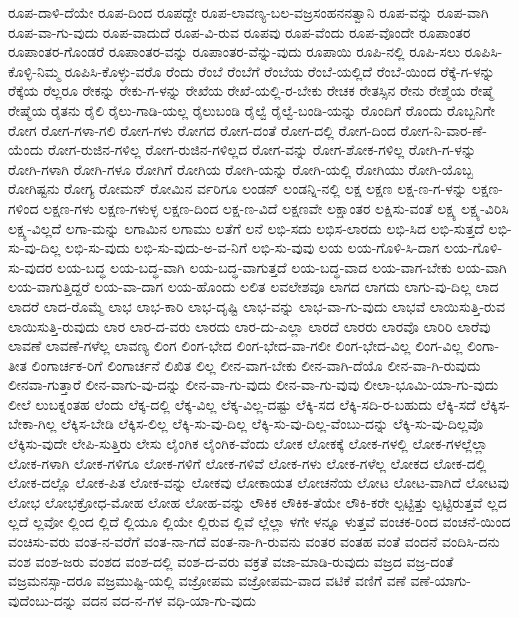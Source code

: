 {ರೂಪ-ದಾಳಿ-ದೆಯೇ
ರೂಪ-ದಿಂದ
ರೂಪದ್ದೇ
ರೂಪ-ಲಾವಣ್ಯ-ಬಲ-ವಜ್ರಸಂಹನನತ್ವಾನಿ
ರೂಪ-ವನ್ನು
ರೂಪ-ವಾಗಿ
ರೂಪ-ವಾ-ಗು-ವುದು
ರೂಪ-ವಾದುದೆ
ರೂಪ-ವಿ-ರುವ
ರೂಪವು
ರೂಪ-ವೆಂದು
ರೂಪ-ವೊಂದೇ
ರೂಪಾಂತರ
ರೂಪಾಂತರ-ಗೊಂಡರೆ
ರೂಪಾಂತರ-ವನ್ನು
ರೂಪಾಂತರ-ವೆನ್ನು-ವುದು
ರೂಪಾಯಿ
ರೂಪಿ-ನಲ್ಲಿ
ರೂಪಿ-ಸಲು
ರೂಪಿಸಿ-ಕೊಳ್ಳಿ-ನಿಮ್ಮ
ರೂಪಿಸಿ-ಕೊಳ್ಳು-ವರೊ
ರೆಂದು
ರೆಂಬೆ
ರೆಂಬೆಗೆ
ರೆಂಬೆಯ
ರೆಂಬೆ-ಯಲ್ಲಿದೆ
ರೆಂಬೆ-ಯಿಂದ
ರೆಕ್ಕೆ-ಗ-ಳನ್ನು
ರೆಕ್ಕೆಯ
ರೆಲ್ಲರೂ
ರೇಕನ್ನು
ರೇಕು-ಗ-ಳನ್ನು
ರೇಖೆಯ
ರೇಖೆ-ಯಲ್ಲಿ-ರ-ಬೇಕು
ರೇಚಕ
ರೇತಸ್ಸಿನ
ರೇನು
ರೇಶ್ಮೆಯ
ರೇಷ್ಮೆ
ರೇಷ್ಮೆಯ
ರೈತನು
ರೈಲಿ
ರೈಲು-ಗಾಡಿ-ಯಲ್ಲ
ರೈಲುಬಂಡಿ
ರೈಲ್ವೆ
ರೈಲ್ವೆ-ಬಂಡಿ-ಯನ್ನು
ರೊಂದಿಗೆ
ರೊಂದು
ರೊಬ್ಬನಿಗೇ
ರೋಗ
ರೋಗ-ಗಳಾ-ಗಲಿ
ರೋಗ-ಗಳು
ರೋಗದ
ರೋಗ-ದಂತೆ
ರೋಗ-ದಲ್ಲಿ
ರೋಗ-ದಿಂದ
ರೋಗ-ನಿ-ವಾರ-ಣೆ-ಯೆಂದು
ರೋಗ-ರುಜಿನ-ಗಳಿಲ್ಲ
ರೋಗ-ರುಜಿನ-ಗಳಿಲ್ಲದ
ರೋಗ-ವನ್ನು
ರೋಗ-ಶೋಕ-ಗಳಿಲ್ಲ
ರೋಗಿ-ಗ-ಳನ್ನು
ರೋಗಿ-ಗಳಾಗಿ
ರೋಗಿ-ಗಳೂ
ರೋಗಿಗೆ
ರೋಗಿಯ
ರೋಗಿ-ಯನ್ನು
ರೋಗಿ-ಯಲ್ಲಿ
ರೋಗಿಯು
ರೋಗಿ-ಯೊಬ್ಬ
ರೋಗಿಷ್ಟನು
ರೋಗ್ಯ
ರೋಮನ್
ರೋಮಿನ
ರ್ವರಿಗೂ
ಲಂಡನ್
ಲಂಡನ್ನಿ-ನಲ್ಲಿ
ಲಕ್ಷ
ಲಕ್ಷಣ
ಲಕ್ಷ-ಣ-ಗ-ಳನ್ನು
ಲಕ್ಷಣ-ಗಳಿಂದ
ಲಕ್ಷಣ-ಗಳು
ಲಕ್ಷಣ-ಗಳುಳ್ಳ
ಲಕ್ಷಣ-ದಿಂದ
ಲಕ್ಷ-ಣ-ವಿದೆ
ಲಕ್ಷಣವೇ
ಲಕ್ಷಾಂತರ
ಲಕ್ಷಿಸು-ವಂತೆ
ಲಕ್ಷ್ಯ
ಲಕ್ಷ್ಯ-ವಿರಿಸಿ
ಲಕ್ಷ್ಯ-ವಿಲ್ಲದೆ
ಲಗಾ-ಮನ್ನು
ಲಗಾಮಿನ
ಲಗಾಮು
ಲತೆಗೆ
ಲನೆ
ಲಭಿ-ಸದು
ಲಭಿಸ-ಲಾರದು
ಲಭಿ-ಸಿದ
ಲಭಿ-ಸುತ್ತದೆ
ಲಭಿ-ಸು-ವು-ದಿಲ್ಲ
ಲಭಿ-ಸು-ವುದು
ಲಭಿ-ಸು-ವುದು-ಅ-ವ-ನಿಗೆ
ಲಭಿ-ಸು-ವುವು
ಲಯ
ಲಯ-ಗೊಳಿ-ಸಿ-ದಾಗ
ಲಯ-ಗೊಳಿ-ಸು-ವುದರ
ಲಯ-ಬದ್ಧ
ಲಯ-ಬದ್ಧ-ವಾಗಿ
ಲಯ-ಬದ್ಧ-ವಾಗುತ್ತದೆ
ಲಯ-ಬದ್ಧ-ವಾದ
ಲಯ-ವಾಗ-ಬೇಕು
ಲಯ-ವಾಗಿ
ಲಯ-ವಾಗುತ್ತಿದ್ದರೆ
ಲಯ-ವಾ-ದಾಗ
ಲಯ-ಹೊಂದು
ಲಲಿತ
ಲವಲೇಶವೂ
ಲಾಗದ
ಲಾಗದು
ಲಾಗು-ವು-ದಿಲ್ಲ
ಲಾದ
ಲಾದರೆ
ಲಾದ-ರೊಮ್ಮೆ
ಲಾಭ
ಲಾಭ-ಕಾರಿ
ಲಾಭ-ದೃಷ್ಟಿ
ಲಾಭ-ವನ್ನು
ಲಾಭ-ವಾ-ಗು-ವುದು
ಲಾಭವೆ
ಲಾಯಿಸುತ್ತಿ-ರುವ
ಲಾಯಿಸುತ್ತಿ-ರುವುದು
ಲಾರ
ಲಾರ-ದ-ವರು
ಲಾರದು
ಲಾರ-ದು-ಎಲ್ಲಾ
ಲಾರದೆ
ಲಾರರು
ಲಾರವೊ
ಲಾರಿರಿ
ಲಾರೆವು
ಲಾವಣೆ
ಲಾವಣೆ-ಗಳೆಲ್ಲ
ಲಾವಣ್ಯ
ಲಿಂಗ
ಲಿಂಗ-ಭೇದ
ಲಿಂಗ-ಭೇದ-ವಾ-ಗಲೀ
ಲಿಂಗ-ಭೇದ-ವಿಲ್ಲ
ಲಿಂಗ-ವಿಲ್ಲ
ಲಿಂಗಾ-ತೀತ
ಲಿಂಗಾರ್ಚಕ-ರಿಗೆ
ಲಿಂಗಾರ್ಚನೆ
ಲಿಖಿತ
ಲಿಲ್ಲ
ಲೀನ-ವಾಗ-ಬೇಕು
ಲೀನ-ವಾಗಿ-ದೆಯೊ
ಲೀನ-ವಾ-ಗಿ-ರುವುದು
ಲೀನವಾ-ಗುತ್ತಾರೆ
ಲೀನ-ವಾಗು-ವು-ದನ್ನು
ಲೀನ-ವಾ-ಗು-ವುದು
ಲೀನ-ವಾ-ಗು-ವುವು
ಲೀಲಾ-ಭೂಮಿ-ಯಾ-ಗು-ವುದು
ಲೀಲೆ
ಲುಬಕ್ನಂತಹ
ಲೆಂದು
ಲೆಕ್ಕ-ದಲ್ಲಿ
ಲೆಕ್ಕ-ವಿಲ್ಲ
ಲೆಕ್ಕ-ವಿಲ್ಲ-ದಷ್ಟು
ಲೆಕ್ಕಿ-ಸದ
ಲೆಕ್ಕಿ-ಸದಿ-ರ-ಬಹುದು
ಲೆಕ್ಕಿ-ಸದೆ
ಲೆಕ್ಕಿಸ-ಬೇಕಾ-ಗಿಲ್ಲ
ಲೆಕ್ಕಿಸ-ಬೇಡಿ
ಲೆಕ್ಕಿಸ-ಲಿಲ್ಲ
ಲೆಕ್ಕಿ-ಸು-ವು-ದಿಲ್ಲ
ಲೆಕ್ಕಿ-ಸು-ವು-ದಿಲ್ಲ-ವೆಂಬು-ದನ್ನು
ಲೆಕ್ಕಿ-ಸು-ವು-ದಿಲ್ಲವೊ
ಲೆಕ್ಕಿಸು-ವುದೇ
ಲೇಪಿ-ಸುತ್ತಿರು
ಲೇಸು
ಲೈಂಗಿಕ
ಲೈಂಗಿಕ-ವೆಂದು
ಲೋಕ
ಲೋಕಕ್ಕೆ
ಲೋಕ-ಗಳಲ್ಲಿ
ಲೋಕ-ಗಳಲ್ಲೆಲ್ಲಾ
ಲೋಕ-ಗಳಾಗಿ
ಲೋಕ-ಗಳಿಗೂ
ಲೋಕ-ಗಳಿಗೆ
ಲೋಕ-ಗಳಿವೆ
ಲೋಕ-ಗಳು
ಲೋಕ-ಗಳೆಲ್ಲ
ಲೋಕದ
ಲೋಕ-ದಲ್ಲಿ
ಲೋಕ-ದಲ್ಲೊ
ಲೋಕ-ಪಿತ
ಲೋಕ-ವನ್ನು
ಲೋಕವು
ಲೋಕಾಯತ
ಲೋಚನೆಯ
ಲೋಟ
ಲೋಟ-ವಾಗಿದೆ
ಲೋಟವು
ಲೋಭ
ಲೋಭಕ್ರೋಧ-ಮೋಹ
ಲೋಹ
ಲೋಹ-ವನ್ನು
ಲೌಕಿಕ
ಲೌಕಿಕ-ತೆಯೇ
ಲೌಕಿ-ಕರೇ
ಲ್ಪಟ್ಟಿತ್ತು
ಲ್ಪಟ್ಟಿರುತ್ತವೆ
ಲ್ಲದ
ಲ್ಲದೆ
ಲ್ಲವೋ
ಲ್ಲಿಂದ
ಲ್ಲಿದೆ
ಲ್ಲಿಯೂ
ಲ್ಲಿಯೇ
ಲ್ಲಿರುವ
ಲ್ಲಿವೆ
ಲ್ಲೆಲ್ಲಾ
ಳಗೇ
ಳನ್ನೂ
ಳುತ್ತವೆ
ವಂಚಕ-ರಿಂದ
ವಂಚನೆ-ಯಿಂದ
ವಂಚಿಸು-ವರು
ವಂತ-ನ-ವರೆಗೆ
ವಂತ-ನಾ-ಗದೆ
ವಂತ-ನಾ-ಗಿ-ರುವನು
ವಂತರ
ವಂತಹ
ವಂತೆ
ವಂದನೆ
ವಂದಿಸಿ-ದನು
ವಂಶ
ವಂಶ-ಜರು
ವಂಶದ
ವಂಶ-ದಲ್ಲಿ
ವಂಶ-ದ-ವರು
ವಕ್ರತೆ
ವಜಾ-ಮಾಡಿ-ರುವುದು
ವಜ್ರದ
ವಜ್ರ-ದಂತೆ
ವಜ್ರಮನಸ್ಸಾ-ದರೂ
ವಜ್ರಮುಷ್ಟಿ-ಯಲ್ಲಿ
ವಜ್ರೋಪಮ
ವಜ್ರೋಪಮ-ವಾದ
ವಟಿಕೆ
ವಣಿಗೆ
ವಣೆ
ವಣೆ-ಯಾಗು-ವುದೆಂಬು-ದನ್ನು
ವದನ
ವದ-ನ-ಗಳ
ವಧಿ-ಯಾ-ಗು-ವುದು
}
